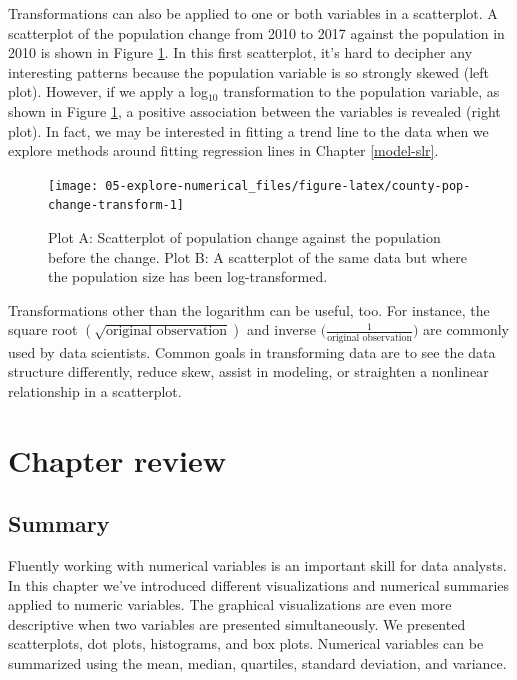 \documentclass[
  10pt,
  openany]{book}
\begin{document}
Transformations can also be applied to one or both variables in a scatterplot.
A scatterplot of the population change from 2010 to 2017 against the population in 2010 is shown in Figure \ref{fig:county-pop-change-transform}.
In this first scatterplot, it's hard to decipher any interesting patterns because the population variable is so strongly skewed (left plot).
However, if we apply a log\(_{10}\) transformation to the population variable, as shown in Figure \ref{fig:county-pop-change-transform}, a positive association between the variables is revealed (right plot).
In fact, we may be interested in fitting a trend line to the data when we explore methods around fitting regression lines in Chapter \ref{model-slr}.

\begin{figure}[h]

{\centering \texttt{[image: 05-explore-numerical\_files/figure-latex/county-pop-change-transform-1]} 

}

\caption{Plot A: Scatterplot of population change against the population before the change. Plot B: A scatterplot of the same data but where the population size has been log-transformed.}\label{fig:county-pop-change-transform}
\end{figure}

Transformations other than the logarithm can be useful, too.
For instance, the square root \((\sqrt{\text{original observation}})\) and inverse \(\bigg ( \frac{1}{\text{original observation}} \bigg )\) are commonly used by data scientists.
Common goals in transforming data are to see the data structure differently, reduce skew, assist in modeling, or straighten a nonlinear relationship in a scatterplot.

\hypertarget{chp5-review}{%
\section{Chapter review}\label{chp5-review}}

\hypertarget{summary-3}{%
\subsection{Summary}\label{summary-3}}

Fluently working with numerical variables is an important skill for data analysts.
In this chapter we've introduced different visualizations and numerical summaries applied to numeric variables.
The graphical visualizations are even more descriptive when two variables are presented simultaneously.
We presented scatterplots, dot plots, histograms, and box plots.
Numerical variables can be summarized using the mean, median, quartiles, standard deviation, and variance.
\end{document}
